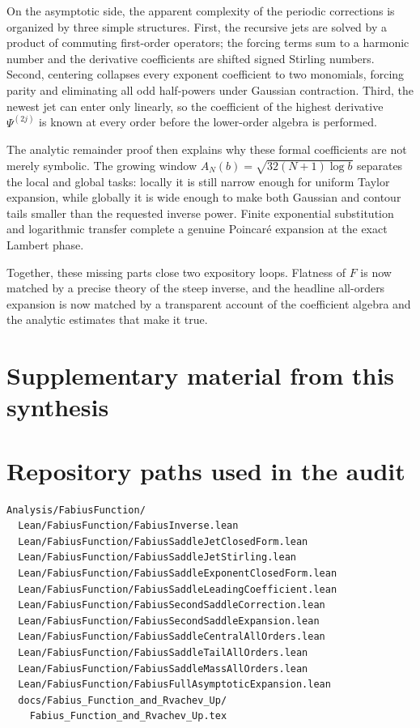\documentclass[11pt,oneside]{article}
\theoremstyle{definition}
\theoremstyle{remark}
\begin{document}
On the asymptotic side, the apparent complexity of the periodic
corrections is organized by three simple structures.  First, the
recursive jets are solved by a product of commuting first-order
operators; the forcing terms sum to a harmonic number and the derivative
coefficients are shifted signed Stirling numbers.  Second, centering
collapses every exponent coefficient to two monomials, forcing parity and
eliminating all odd half-powers under Gaussian contraction.  Third, the
newest jet can enter only linearly, so the coefficient of the highest
derivative $\Psi^{(2j)}$ is known at every order before the lower-order
algebra is performed.

The analytic remainder proof then explains why these formal coefficients
are not merely symbolic.  The growing window
$A_N(b)=\sqrt{32(N+1)\log b}$ separates the local and global tasks:
locally it is still narrow enough for uniform Taylor expansion, while
globally it is wide enough to make both Gaussian and contour tails smaller
than the requested inverse power.  Finite exponential substitution and
logarithmic transfer complete a genuine Poincar\'e expansion at the exact
Lambert phase.

Together, these missing parts close two expository loops.  Flatness of
$F$ is now matched by a precise theory of the steep inverse, and the
headline all-orders expansion is now matched by a transparent account of
the coefficient algebra and the analytic estimates that make it true.

\clearpage
\section*{Supplementary material from this synthesis}
\section{Repository paths used in the audit}
\label{inverse:app:paths}

\begin{lstlisting}[style=pseudo]
Analysis/FabiusFunction/
  Lean/FabiusFunction/FabiusInverse.lean
  Lean/FabiusFunction/FabiusSaddleJetClosedForm.lean
  Lean/FabiusFunction/FabiusSaddleJetStirling.lean
  Lean/FabiusFunction/FabiusSaddleExponentClosedForm.lean
  Lean/FabiusFunction/FabiusSaddleLeadingCoefficient.lean
  Lean/FabiusFunction/FabiusSecondSaddleCorrection.lean
  Lean/FabiusFunction/FabiusSecondSaddleExpansion.lean
  Lean/FabiusFunction/FabiusSaddleCentralAllOrders.lean
  Lean/FabiusFunction/FabiusSaddleTailAllOrders.lean
  Lean/FabiusFunction/FabiusSaddleMassAllOrders.lean
  Lean/FabiusFunction/FabiusFullAsymptoticExpansion.lean
  docs/Fabius_Function_and_Rvachev_Up/
    Fabius_Function_and_Rvachev_Up.tex
\end{lstlisting}
\end{document}
